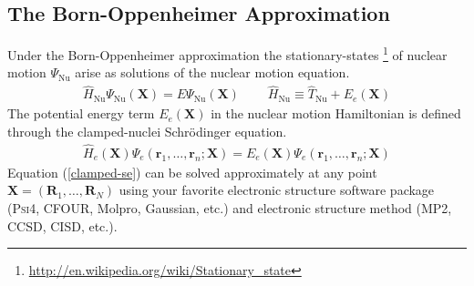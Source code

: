\documentclass[11pt]{article}
\newcommand{\bo}[1]{\ensuremath{\mathbf{#1}}}
\renewcommand{\sp}{\ \ \ \ \ \ \ \ \ \ }
\newcommand{\ld}{\ensuremath{\ldots}}
\newcommand{\Nu}{\ensuremath{\mathrm{Nu}}}
\newcommand{\op}[1]{\ensuremath{\hat{#1}}}
\newcommand{\Y}{\ensuremath{\Psi}}
\begin{document}
\subsection{The Born-Oppenheimer Approximation}
Under the Born-Oppenheimer approximation the stationary-states \footnote{\url{http://en.wikipedia.org/wiki/Stationary_state}} of nuclear motion $\Y_\Nu$ arise as solutions of the nuclear motion equation.
\begin{align}
\label{pes}
	\op{H}_\Nu
	\Y_\Nu(\bo{X})
=
	E
	\Y_\Nu(\bo{X})
\sp
	\op{H}_\Nu
\equiv
	\op{T}_\Nu+E_e(\bo{X})
\end{align}
The potential energy term $E_e(\bo{X})$ in the nuclear motion Hamiltonian is defined through the clamped-nuclei Schr\"odinger equation.
\begin{align}
\label{clamped-se}
	\op{H}_e(\bo{X})
	\Y_e(\bo{r}_1,\ld,\bo{r}_n;\bo{X})
=
	E_e(\bo{X})
	\Y_e(\bo{r}_1,\ld,\bo{r}_n;\bo{X})
\end{align}
Equation (\ref{clamped-se}) can be solved approximately at any point $\bo{X}=(\bo{R}_1,\ld,\bo{R}_N)$ using your favorite electronic structure software package (\textsc{Psi4}, CFOUR, Molpro, Gaussian, etc.) and electronic structure method (MP2, CCSD, CISD, etc.).
\end{document}
